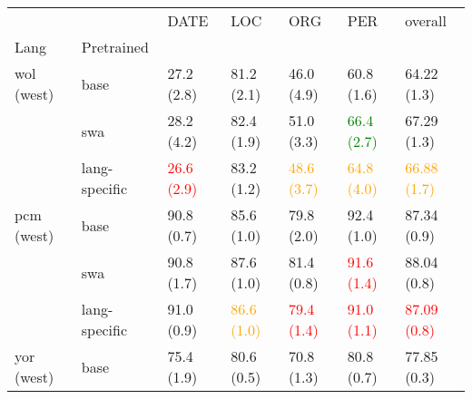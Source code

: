 \begin{tabular}{lllllll}
\toprule
           &               &                                             DATE &                             LOC &                                              ORG &                                              PER &                                           overall \\
Lang & Pretrained &                                                  &                                 &                                                  &                                                  &                                                   \\
\midrule
wol (west) & base &                                       27.2 (2.8) &                      81.2 (2.1) &                                       46.0 (4.9) &                                       60.8 (1.6) &                                       64.22 (1.3) \\
           & swa &                                       28.2 (4.2) &                      82.4 (1.9) &                                       51.0 (3.3) &                    \textcolor{green}{66.4 (2.7)} &                                       67.29 (1.3) \\
           & lang-specific &  \textcolor{orange}{\textcolor{red}{26.6 (2.9)}} &                      83.2 (1.2) &                   \textcolor{orange}{48.6 (3.7)} &                   \textcolor{orange}{64.8 (4.0)} &                   \textcolor{orange}{66.88 (1.7)} \\
\midrule
pcm (west) & base &                                       90.8 (0.7) &                      85.6 (1.0) &                                       79.8 (2.0) &                                       92.4 (1.0) &                                       87.34 (0.9) \\
           & swa &                                       90.8 (1.7) &                      87.6 (1.0) &                                       81.4 (0.8) &                      \textcolor{red}{91.6 (1.4)} &                                       88.04 (0.8) \\
           & lang-specific &                                       91.0 (0.9) &  \textcolor{orange}{86.6 (1.0)} &  \textcolor{orange}{\textcolor{red}{79.4 (1.4)}} &  \textcolor{orange}{\textcolor{red}{91.0 (1.1)}} &  \textcolor{orange}{\textcolor{red}{87.09 (0.8)}} \\
\midrule
yor (west) & base &                                       75.4 (1.9) &                      80.6 (0.5) &                                       70.8 (1.3) &                                       80.8 (0.7) &                                       77.85 (0.3) \\

\end{tabular}
